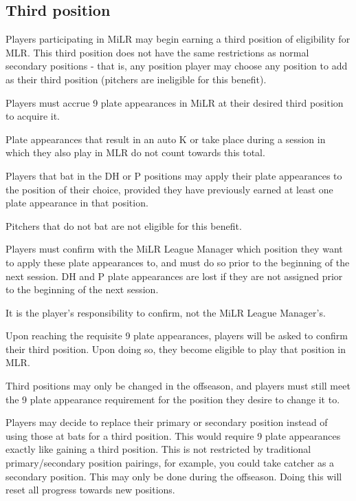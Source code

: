 \subsection{Third position}
\begin{deepEnumerate}
    \item Players participating in MiLR may begin earning a third position of eligibility for MLR. 
    This third position does not have the same restrictions as normal secondary positions - 
    that is, any position player may choose any position to add as their third position (pitchers are ineligible for this benefit).
    \item Players must accrue 9 plate appearances in MiLR at their desired third position to acquire it.    
    \begin{deepEnumerate}
        \item Plate appearances that result in an auto K or take place during a session in which they also play in MLR do not count towards this total.
        \item Players that bat in the DH or P positions may apply their plate appearances to the position of their choice, 
        provided they have previously earned at least one plate appearance in that position.
        \begin{deepEnumerate}
            \item Pitchers that do not bat are not eligible for this benefit.
            \item Players must confirm with the MiLR League Manager which position they want to apply these plate appearances to, 
            and must do so prior to the beginning of the next session. 
            DH and P plate appearances are lost if they are not assigned prior to the beginning of the next session.
            \begin{deepEnumerate}
                \item It is the player's responsibility to confirm, not the MiLR League Manager's.
            \end{deepEnumerate}
        \end{deepEnumerate}
        \item Upon reaching the requisite 9 plate appearances, players will be asked to confirm their third position. 
        Upon doing so, they become eligible to play that position in MLR.
    \end{deepEnumerate}
    \item Third positions may only be changed in the offseason, 
    and players must still meet the 9 plate appearance requirement for the position they desire to change it to.
    \item Players may decide to replace their primary or secondary position instead of using those at bats for a third position. 
    This would require 9 plate appearances exactly like gaining a third position. This is not restricted by traditional primary/secondary position pairings, 
    for example, you could take catcher as a secondary position. This may only be done during the offseason. Doing this will reset all progress towards new positions.
\end{deepEnumerate}

